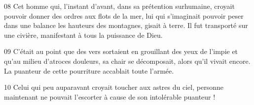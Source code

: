 
08 Cet homme qui, l’instant d’avant, dans sa prétention surhumaine, croyait pouvoir donner des ordres aux flots de la mer, lui qui s’imaginait pouvoir peser dans une balance les hauteurs des montagnes, gisait à terre. Il fut transporté sur une civière, manifestant à tous la puissance de Dieu.

09 C’était au point que des vers sortaient en grouillant des yeux de l’impie et qu’au milieu d’atroces douleurs, sa chair se décomposait, alors qu’il vivait encore. La puanteur de cette pourriture accablait toute l’armée.

10 Celui qui peu auparavant croyait toucher aux astres du ciel, personne maintenant ne pouvait l’escorter à cause de son intolérable puanteur !